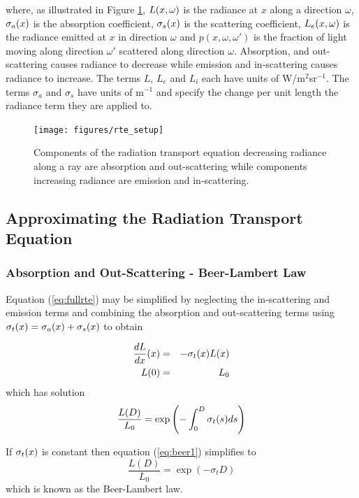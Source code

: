 \noindent where, as illustrated in Figure \ref{figRadiance}, $L(x,\omega)$ is the radiance at $x$ along a direction $\omega$, $\sigma_a(x)$ is the absorption coefficient, $\sigma_s(x)$ is the scattering coefficient, $L_e(x,\omega)$ is the radiance emitted at $x$ in direction $\omega$ and $p(x,\omega,\omega')$ is the fraction of light moving along direction $\omega'$ scattered along direction $\omega$. Absorption, and out-scattering causes radiance to decrease while emission and in-scattering causes radiance to increase. The terms $L$, $L_e$ and $L_i$ each have units of W/m$^2$sr$^{-1}$.  The terms $\sigma_a$ and $\sigma_s$ have units of m$^{-1}$ and specify the change per unit length the radiance term they are applied to.
\begin{figure}[\figoptions]
\begin{center}
\texttt{[image: figures/rte\_setup]}
\end{center}
\caption{Components of the radiation transport equation decreasing radiance along a ray are
absorption and out-scattering while components increasing radiance are emission and in-scattering.}
\label{figRadiance}
\end{figure}

%
%

\subsection{Approximating the Radiation Transport Equation}

%
%

\subsubsection{Absorption and Out-Scattering - Beer-Lambert Law}
Equation (\ref{eq:fullrte}) may be simplified by neglecting the in-scattering and emission terms and combining the absorption and out-scattering terms using $\sigma_t(x)=\sigma_a(x)+\sigma_s(x)$ to obtain

\begin{eqnarray*}
\frac{dL}{dx}(x)&=&-\sigma_t(x) L(x)\\
L(0)&=&L_0
\end{eqnarray*}
which has solution
\begin{equation}
\label{eq:beer1} \frac{L(D)}{L_0}=\exp\left({-\int_0^D \sigma_t(s) ds}\right)
\end{equation}

If $\sigma_t(x)$ is constant then equation (\ref{eq:beer1}) simplifies
to
\begin{equation}
\label{eq:beer2} \frac{L(D)}{L_0}=\exp(-\sigma_t D)
\end{equation}
which is known as the Beer-Lambert law\cite{}.

